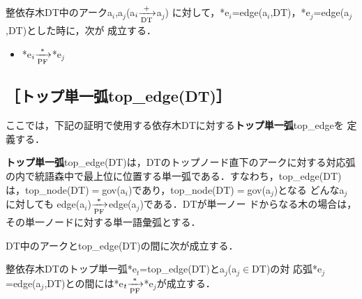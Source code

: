 \begin{lemma}[子孫アークと対応する弧]
\label{lem:app2-4}
整依存木DT中のアークa$_i$,a$_j$(a$_i{\xrightarrow[{\rm DT}]{+}}$a$_j$)
に対して，*e$_i$=edge(a$_i$,DT)，*e$_j$=edge(a$_j$,DT)とした時に，次が
成立する．
\begin{itemize}
\item[] *e$_i{\xrightarrow[{\rm PF}]{*}}$*e$_j$
\end{itemize}

\end{lemma}

\subsection*{［トップ単一弧top\_edge(DT)］}

ここでは，下記の証明で使用する依存木DTに対する{\bf トップ単一弧}top\_edgeを
定義する．

\begin{definition}
{\bf トップ単一弧}top\_edge(DT)は，DTのトップノード直下のアークに対する対応弧
の内で統語森中で最上位に位置する単一弧である．すなわち，top\_edge(DT) 
は，top\_node(DT)$=$gov(a$_i$)であり，top\_node(DT)$=$gov(a$_j$)となる
どんなa$_j$に対しても
edge(a$_i$)${\xrightarrow[{\rm PF}]{*}}$edge(a$_j$)である．DTが単一ノー
ドからなる木の場合は，その単一ノードに対する単一語彙弧とする．
\end{definition}

{\mynoindent}DT中のアークとtop\_edge(DT)の間に次が成立する．

\begin{lemma}
\label{lem:RelBetweenTopedgeAndEdge}

整依存木DTのトップ単一弧*e$_t$=top\_edge(DT)とa$_j$(a$_j{\in}$DT)の対
応弧*e$_j$=edge(a$_j$,DT)との間には*e$_t{\xrightarrow[{\rm
PF}]{*}}$*e$_j$が成立する．

\end{lemma}

